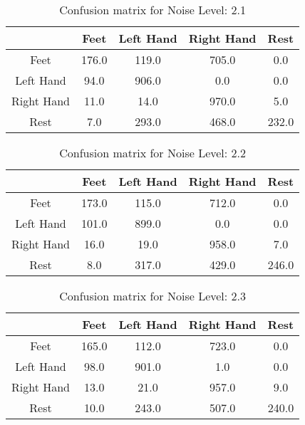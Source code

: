 \begin{table}[!htbp]
    \centering
    \begin{tabular}{|c||c|c|c|c|}
        \hline
		 & Feet & Left Hand & Right Hand & Rest \\
        \hline
        \hline
        Feet & 176.0 & 119.0 & 705.0 & 0.0 \\
        \hline
        Left Hand & 94.0 & 906.0 & 0.0 & 0.0 \\
        \hline
        Right Hand & 11.0 & 14.0 & 970.0 & 5.0 \\
        \hline
        Rest & 7.0 & 293.0 & 468.0 & 232.0 \\
        \hline
    \end{tabular}
    \caption{Confusion matrix for Noise Level: 2.1}
\end{table}

\begin{table}[!htbp]
    \centering
    \begin{tabular}{|c||c|c|c|c|}
        \hline
		 & Feet & Left Hand & Right Hand & Rest \\
        \hline
        \hline
        Feet & 173.0 & 115.0 & 712.0 & 0.0 \\
        \hline
        Left Hand & 101.0 & 899.0 & 0.0 & 0.0 \\
        \hline
        Right Hand & 16.0 & 19.0 & 958.0 & 7.0 \\
        \hline
        Rest & 8.0 & 317.0 & 429.0 & 246.0 \\
        \hline
    \end{tabular}
    \caption{Confusion matrix for Noise Level: 2.2}
\end{table}

\begin{table}[!htbp]
    \centering
    \begin{tabular}{|c||c|c|c|c|}
        \hline
		 & Feet & Left Hand & Right Hand & Rest \\
        \hline
        \hline
        Feet & 165.0 & 112.0 & 723.0 & 0.0 \\
        \hline
        Left Hand & 98.0 & 901.0 & 1.0 & 0.0 \\
        \hline
        Right Hand & 13.0 & 21.0 & 957.0 & 9.0 \\
        \hline
        Rest & 10.0 & 243.0 & 507.0 & 240.0 \\
        \hline
    \end{tabular}
    \caption{Confusion matrix for Noise Level: 2.3}
\end{table}

